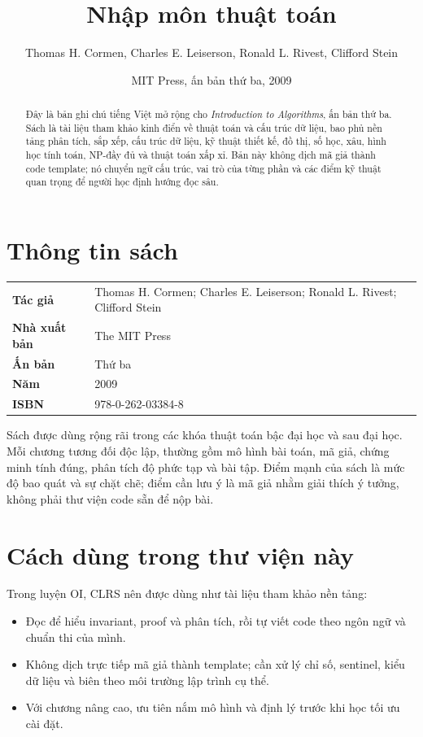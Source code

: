 \documentclass[11pt]{article}
\title{Nhập môn thuật toán}
\author{Thomas H. Cormen, Charles E. Leiserson, Ronald L. Rivest, Clifford Stein}
\date{MIT Press, ấn bản thứ ba, 2009}
\begin{document}
\maketitle


\renewcommand{\abstractname}{Tóm tắt}
\begin{abstract}
Đây là bản ghi chú tiếng Việt mở rộng cho \emph{Introduction to Algorithms},
ấn bản thứ ba. Sách là tài liệu tham khảo kinh điển về thuật toán và cấu trúc
dữ liệu, bao phủ nền tảng phân tích, sắp xếp, cấu trúc dữ liệu, kỹ thuật thiết
kế, đồ thị, số học, xâu, hình học tính toán, NP-đầy đủ và thuật toán xấp xỉ.
Bản này không dịch mã giả thành code template; nó chuyển ngữ cấu trúc, vai trò
của từng phần và các điểm kỹ thuật quan trọng để người học định hướng đọc sâu.
\end{abstract}

\section{Thông tin sách}

\begin{center}
\begin{tabular}{ll}
\textbf{Tác giả} & Thomas H. Cormen; Charles E. Leiserson; Ronald L. Rivest; Clifford Stein \\
\textbf{Nhà xuất bản} & The MIT Press \\
\textbf{Ấn bản} & Thứ ba \\
\textbf{Năm} & 2009 \\
\textbf{ISBN} & 978-0-262-03384-8
\end{tabular}
\end{center}

Sách được dùng rộng rãi trong các khóa thuật toán bậc đại học và sau đại học.
Mỗi chương tương đối độc lập, thường gồm mô hình bài toán, mã giả, chứng minh
tính đúng, phân tích độ phức tạp và bài tập. Điểm mạnh của sách là mức độ bao
quát và sự chặt chẽ; điểm cần lưu ý là mã giả nhằm giải thích ý tưởng, không
phải thư viện code sẵn để nộp bài.

\section{Cách dùng trong thư viện này}

Trong luyện OI, CLRS nên được dùng như tài liệu tham khảo nền tảng:
\begin{itemize}
  \item Đọc để hiểu invariant, proof và phân tích, rồi tự viết code theo ngôn
        ngữ và chuẩn thi của mình.
  \item Không dịch trực tiếp mã giả thành template; cần xử lý chỉ số, sentinel,
        kiểu dữ liệu và biên theo môi trường lập trình cụ thể.
  \item Với chương nâng cao, ưu tiên nắm mô hình và định lý trước khi học tối ưu
        cài đặt.
\end{itemize}
\end{document}

